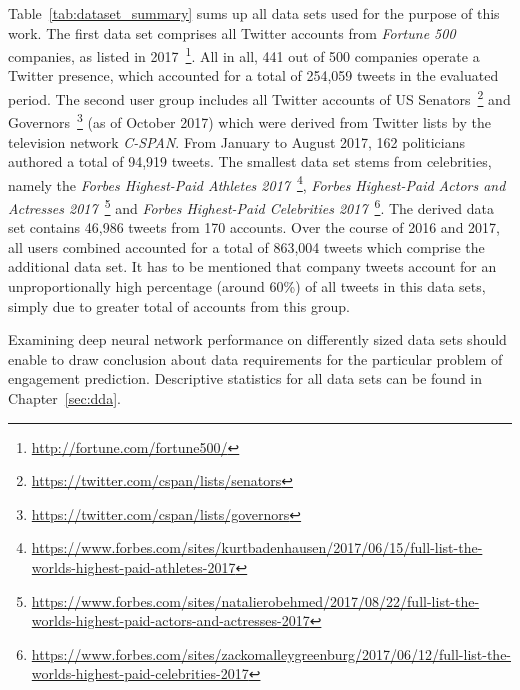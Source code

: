 Table~\ref{tab:dataset_summary} sums up all data sets used for the purpose of
this work.
The first data set comprises all Twitter accounts from \textit{Fortune 500}
companies, as listed in 2017~\footnote{\url{http://fortune.com/fortune500/}}.
All in all, 441 out of 500 companies operate a Twitter presence, which accounted
for a total of 254,059 tweets in the evaluated period.
The second user group includes all Twitter accounts of US Senators~\footnote{\url{https://twitter.com/cspan/lists/senators}} and Governors~\footnote{\url{https://twitter.com/cspan/lists/governors}}
(as of October 2017) which were derived from Twitter lists by the television
network \textit{C-SPAN}.
From January to August 2017, 162 politicians authored a total of 94,919 tweets.
The smallest data set stems from celebrities, namely the \textit{Forbes Highest-Paid
Athletes 2017}~\footnote{\url{https://www.forbes.com/sites/kurtbadenhausen/2017/06/15/full-list-the-worlds-highest-paid-athletes-2017}}, \textit{Forbes Highest-Paid Actors and Actresses 2017}~\footnote{\url{https://www.forbes.com/sites/natalierobehmed/2017/08/22/full-list-the-worlds-highest-paid-actors-and-actresses-2017}} and
\textit{Forbes Highest-Paid Celebrities 2017}~\footnote{\url{https://www.forbes.com/sites/zackomalleygreenburg/2017/06/12/full-list-the-worlds-highest-paid-celebrities-2017}}.
The derived data set contains 46,986 tweets from 170 accounts.
Over the course of 2016 and 2017, all users combined accounted for a total
of 863,004 tweets which comprise the additional data set.
It has to be mentioned that company tweets account for an unproportionally high
percentage (around 60\%) of all tweets in this data sets, simply due to greater
total of accounts from this group.

Examining deep neural network performance on differently sized data sets should
enable to draw conclusion about data requirements for the particular problem
of engagement prediction.
Descriptive statistics for all data sets can be found in Chapter~\ref{sec:dda}.
